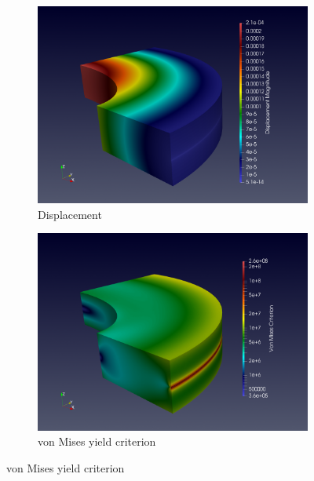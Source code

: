 \begin{figure}[!ht]
  \centering
  \begin{subfigure}[c]{0.49\textwidth}
    \centering
    \includegraphics[width=\textwidth]{graphics/feelpp/feelpp-benchmark-nafems-le10-solution-disp.png}
    \caption{Displacement}
    \label{fig:feelpp:wp1:nafems-le10:results:visualization:displacement}
  \end{subfigure}
  \hfill
  \begin{subfigure}[c]{0.49\textwidth}
    \centering
    \includegraphics[width=\textwidth]{graphics/feelpp/feelpp-benchmark-nafems-le10-solution-vonmises.png}
    \caption{von Mises yield criterion}
    \label{fig:feelpp:wp1:nafems-le10:results:visualization:vonmises}
  \end{subfigure}

\end{figure}
